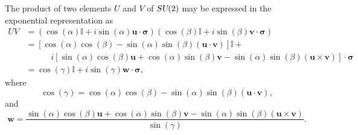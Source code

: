 \documentclass[12pt]{amsart}
\def\su2{\textsl{SU}(2)}
\theoremstyle{definition}
\theoremstyle{remark}
\numberwithin{equation}{section}
\begin{document}
The product of two elements $U$ and $V$ of $\su2$ may be expressed in the  exponential representation as
\begin{equation}
	\begin{split}
	UV &= (\cos(\alpha)\mathbb{I} + i\sin(\alpha)\mathbf{u}\cdot\boldsymbol{\sigma})(\cos(\beta)\mathbb{I} + i\sin(\beta)\mathbf{v}\cdot\boldsymbol{\sigma}) \\
	&= [\cos(\alpha)\cos(\beta) - \sin(\alpha)\sin(\beta) (\mathbf{u}\cdot\mathbf{v})] \mathbb{I} + \\& \quad\quad\quad i [\sin(\alpha)\cos(\beta)\mathbf{u} + \cos(\alpha)\sin(\beta)\mathbf{v} - \sin(\alpha)\sin(\beta) (\mathbf{u}\times \mathbf{v})]\cdot\boldsymbol{\sigma} \\ 
	&= \cos(\gamma) \mathbb{I} + i\sin(\gamma) \mathbf{w}\cdot\boldsymbol{\sigma},
	\end{split}
\end{equation}
where 
\begin{equation}
	\cos(\gamma) = \cos(\alpha)\cos(\beta) - \sin(\alpha)\sin(\beta) (\mathbf{u}\cdot\mathbf{v}),
\end{equation}
and
\begin{equation}
	\mathbf{w} = \frac{\sin(\alpha)\cos(\beta)\mathbf{u} + \cos(\alpha)\sin(\beta)\mathbf{v} - \sin(\alpha)\sin(\beta) (\mathbf{u}\times \mathbf{v})}{\sin(\gamma)}.
\end{equation}
\end{document}
